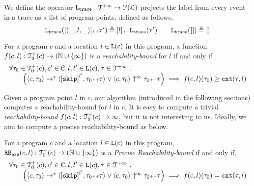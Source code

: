 %
We define the operator $\mathtt{L}_{\mathtt{{trace}}} : \mathcal{T}^{+\infty} \to \mathcal{P}{(\mathcal{L})}$ projects the label from every event in a trace as a list of program points,
defined as follows,
\[
\mathtt{L}_{\mathtt{{trace}}}([(\_, l, \_)] {\scriptscriptstyle ++} \mathtt{\tau}') \triangleq [l] {\scriptscriptstyle ++} \mathtt{L}_{\mathtt{{trace}}}(\mathtt{\tau}')
\qquad
\mathtt{L}_{\mathtt{{trace}}}([ ]) \triangleq []
\]
%
\begin{defn}
 \label{def:rb}
 For a program ${c}$ and a location $l \in \mathtt{L}(c)$ in this program,
a function $f(c, l) : \mathcal{T}^{+}_0(c) \to (\mathbb{N} \cup \{\infty\})$ is a \emph{reachability-bound} for $l$ if and only if
\[
 \begin{array}{l}
 \forall \trace_0 \in \ftdom_0(c), c' \in \cdom, l, l' \in \progl(c), \trace \in \tdom \st 
 \\ \qquad
 \Big(
 \config{{c}, \trace_0} \to^{*} \config{\clabel{\eskip}^{l'}, \trace_0 \tracecat \trace} 
 \lor 
 \config{{c}, \trace_0} \uparrow^{\infty} \trace_0 \tracecat \trace 
 \Big)
 \implies f({c}, l)(\trace_0) \geq \counter(\trace, l) 
 \end{array}
 \]
\end{defn}
Given a program point $l$ in $c$, our algorithm (introduced in the following sections) computes a reachability-bound for $l$ in $c$.
It is easy to compute a trivial \emph{reachability-bound} $f(c, l): \mathcal{T}^{+}_0(c) \to \infty$, but it is not interesting to us.
Ideally, we aim to compute a precise reachability-bound as below.

\begin{defn}
 \label{def:exe_rb}
 For a program ${c}$ and a location $l \in \mathtt{L}(c)$ in this program,
$\mathtt{RB_{exe}}({c}, l): \mathcal{T}^{+}_0(c) \to (\mathbb{N} \cup \{\infty\})$ is a \emph{Precise Reachability-bound} if and only if,
\[
 \begin{array}{l}
 \forall \trace_0 \in \ftdom_0(c), c' \in \cdom, l, l' \in \progl(c), \trace \in \tdom \st 
 \\ \qquad
 \Big(
 \config{{c}, \trace_0} \to^{*} \config{\clabel{\eskip}^{l'}, \trace_0 \tracecat \trace} 
 \lor 
 \config{{c}, \trace_0} \uparrow^{\infty} \trace_0 \tracecat \trace 
 \Big)
 \implies f({c}, l)(\trace_0) = \counter(\trace, l) 
 \end{array}
 \]
\end{defn}

